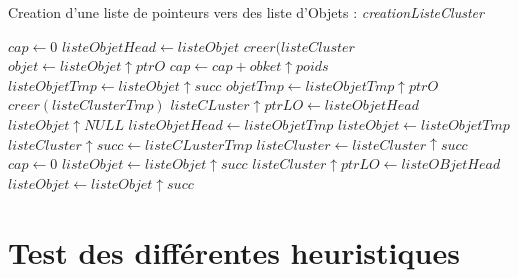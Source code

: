 \documentclass[twoside,UTF8]{EPURapport}
\begin{document}
\begin{algorithm}[H]
\caption{Creation d'une liste de pointeurs vers des liste d'Objets : \textit{creationListeCluster}}
\label{algo:creationTabObjet}
\begin{algorithmic}[1]

\STATE $cap \leftarrow 0$
\STATE $listeObjetHead \leftarrow listeObjet$
\STATE $creer(listeCluster$
	 \STATE $objet \leftarrow listeObjet\uparrow ptrO$
	 \STATE $cap \leftarrow cap + obket\uparrow poids$
	 	\STATE $listeObjetTmp \leftarrow listeObjet\uparrow succ$
	 	\STATE $objetTmp \leftarrow listeObjetTmp\uparrow ptrO$
	 		\STATE $creer(listeClusterTmp)$
	 		\STATE $listeCLuster\uparrow ptrLO \leftarrow listeObjetHead$
	 		\STATE $listeObjet\uparrow NULL$
	 		\STATE $listeObjetHead \leftarrow listeObjetTmp$
	 		\STATE $listeObjet \leftarrow listeObjetTmp$
	 		\STATE $listeCluster\uparrow succ \leftarrow listeCLusterTmp$
	 		\STATE $listeCluster \leftarrow listeCluster\uparrow succ$
	 		\STATE $cap \leftarrow 0$
	 	\ELSE
	 		\STATE $listeObjet \leftarrow listeObjet\uparrow succ$
	 	\ENDIF
	 	\STATE $listeCluster\uparrow ptrLO \leftarrow listeOBjetHead$
	 	\STATE $listeObjet \leftarrow listeObjet\uparrow succ$
	 \ENDIF
\ENDWHILE
	 

\end{algorithmic}
\end{algorithm}





\chapter{Test des différentes heuristiques}
\label{chap:test}
\end{document}
